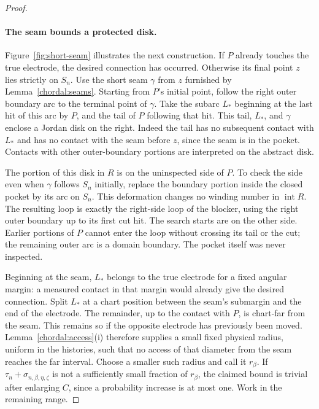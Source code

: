\begin{proof}
\paragraph{The seam bounds a protected disk.}
Figure~\ref{fig:short-seam} illustrates the next construction.
If $P$ already touches the true electrode, the desired connection
has occurred.  Otherwise its final point $z$ lies strictly on $S_n$.
Use the short seam $\gamma$ from $z$ furnished by
Lemma~\ref{chordal:seams}.  Starting from $P$'s initial point, follow
the right outer boundary arc to the terminal point of $\gamma$.
Take the subarc $L_*$ beginning at the last hit of this arc by $P$,
and the tail of $P$ following that hit.  This tail, $L_*$, and
$\gamma$ enclose a Jordan disk on the right.  Indeed the tail has
no subsequent contact with $L_*$ and has no contact with the seam
before $z$, since the seam is in the pocket.  Contacts with other
outer-boundary portions are interpreted on the abstract disk.

The portion of this disk in $R$ is on the uninspected side of $P$.
To check the side even when $\gamma$ follows $S_n$ initially, replace
the boundary portion inside the closed pocket by its arc on $S_n$.
This deformation changes no winding number in $\operatorname{int}R$.
The resulting loop is exactly the right-side loop of the blocker,
using the right outer boundary up to its first cut hit.  The search
starts are on the other side.  Earlier portions of $P$ cannot enter
the loop without crossing its tail or the cut; the remaining outer
arc is a domain boundary.  The pocket itself was never inspected.

Beginning at the seam, $L_*$ belongs to the true electrode for a
fixed angular margin: a measured contact in that margin would
already give the desired connection.  Split $L_*$ at a chart
position between the seam's submargin and the end of the electrode.
The remainder, up to the contact with $P$, is chart-far from the
seam.  This remains so if the opposite electrode has previously
been moved.  Lemma~\ref{chordal:access}(i) therefore supplies a
small fixed physical radius, uniform in the histories, such that
no access of that diameter from the seam reaches the far interval.
Choose a smaller such radius and call it $r_\beta$.  If
$\tau_n+\sigma_{n,\beta,\eta,\zeta}$ is not a sufficiently small
fraction of $r_\beta$, the claimed bound is trivial after enlarging
$C$, since a probability increase is at most one.  Work in the
remaining range.


\end{proof}
